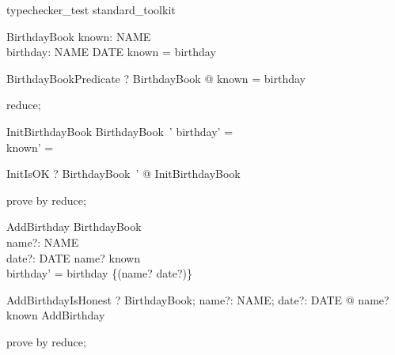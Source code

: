 \begin{zsection}
   \SECTION typechecker\_test \parents standard\_toolkit
\end{zsection}

\begin{zed}
\end{zed}

\begin{schema}{BirthdayBook}
  known: \power NAME \\
  birthday: NAME \pfun DATE
\where
  known = \dom  birthday
\end{schema}

\begin{theorem}{BirthdayBookPredicate}
\vdash? \forall BirthdayBook @ known = \dom birthday
\end{theorem}

\begin{zproof}[BirthdayBookPredicate]
reduce;
\end{zproof}

\begin{schema}{InitBirthdayBook}
  BirthdayBook~'
\where
  birthday' = \emptyset\\
  known' = \emptyset
\end{schema}

\begin{theorem}{InitIsOK}
\vdash? \exists  BirthdayBook~' @ InitBirthdayBook
\end{theorem}

\begin{zproof}[InitIsOK]
prove by reduce;
\end{zproof}

\begin{schema}{AddBirthday}
  \Delta BirthdayBook\\
  name?: NAME\\
  date?: DATE
\where
  name? \notin  known\\
  birthday' = birthday \cup  \{(name? \mapsto  date?)\}
\end{schema}

\begin{theorem}{AddBirthdayIsHonest}
\vdash? \forall  BirthdayBook; name?: NAME; date?: DATE @ name? \notin  known \implies  \pre  AddBirthday
\end{theorem}

\begin{zproof}[AddBirthdayIsHonest]
prove by reduce;
\end{zproof}


